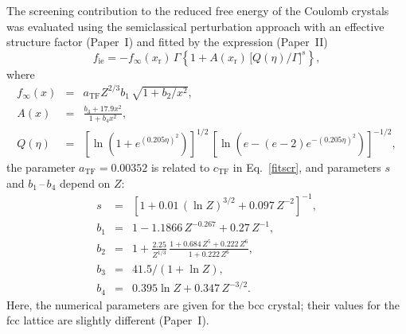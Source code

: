 \documentclass[traditabstract]{aa}
\newcommand{\beq}{\begin{equation}}
\newcommand{\eeq}{\end{equation}}
\newcommand{\bea}{\begin{eqnarray}}
\newcommand{\eea}{\end{eqnarray}}
\newcommand{\req}[1]{Eq.~\ref{#1}}
\newcommand{\xr}{x_\mathrm{r}}
\begin{document}
The screening contribution to the reduced free energy of the
Coulomb crystals was evaluated using the semiclassical
perturbation approach with an effective structure factor
(Paper~I) and fitted by the expression (Paper~II)
\beq
   f_\mathrm{ie} = -f_\infty(\xr)\,\Gamma
         \left\{ 1 + A(\xr)\,\big[Q(\eta)/\Gamma\big]^s
\right\},
\label{fitscr-sol}
\eeq
where
\bea
   f_\infty(x) &=& a_\mathrm{TF} Z^{2/3} b_1\,\sqrt{1+b_2/x^2},
\nonumber\\
   A(x) &=& \frac{ b_3+17.9 x^2 }{ 1+b_4 x^2 },
\nonumber\\
   Q(\eta) &=& \left[ { \ln\left(1+e^{(0.205\eta)^2} \right)
          }\right]^{1/2}\,\left[{
             \ln\left(e-(e-2)e^{-(0.205\eta)^2} \right)}
             \right]^{-1/2},
\nonumber
\eea
the parameter $a_\mathrm{TF} = 0.00352$ is related to
$c_\mathrm{TF}$ in \req{fitscr},
and parameters $s$ and $b_1$\,--\,$b_4$ depend on $Z$:
\bea
   s &=& \left[ 1+0.01\,(\ln Z)^{3/2} + 0.097\,Z^{-2} \right]^{-1},
\nonumber\\
  b_1 &=& 1 - 1.1866 \,Z^{-0.267} + 0.27\,Z^{-1},
\nonumber\\
  b_2 &=& 1 + \frac{2.25}{ Z^{1/3}}\,
      \frac{1+0.684\,Z^5+0.222\,Z^6 }{ 1+0.222\,Z^6},
\nonumber\\
  b_3 &=& 41.5/(1+\ln Z),
\nonumber\\
  b_4 &=& 0.395 \ln Z + 0.347\, Z^{-3/2}.
\nonumber
\eea
Here, the numerical parameters are given for the bcc
crystal;
their values for the fcc lattice are slightly different
(Paper~I).
\end{document}
